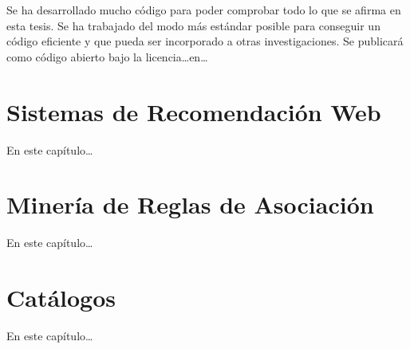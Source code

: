 Se ha desarrollado mucho código para poder comprobar todo lo que se afirma en esta tesis. Se ha trabajado del modo más estándar posible para conseguir un código eficiente y que pueda ser incorporado a otras investigaciones. Se publicará como código abierto bajo la licencia\ldots en\ldots




\section{Sistemas de Recomendación Web}
En este capítulo\ldots




\section{Minería de Reglas de Asociación}
En este capítulo\ldots




\section{Catálogos}
En este capítulo\ldots




